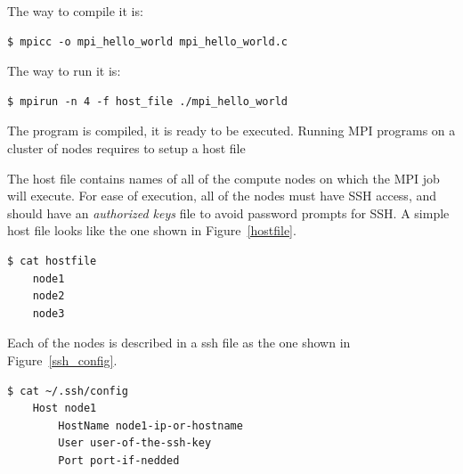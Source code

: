 \newpage

The way to compile it is: 

\begin{minipage}{\textwidth}
\end{minipage}

\begin{minipage}{\textwidth}
\begin{lstlisting}[frame=single]
  $ mpicc -o mpi_hello_world mpi_hello_world.c
\end{lstlisting}
\end{minipage}

The way to run it is: 

\begin{minipage}{\textwidth}
\end{minipage}

\begin{minipage}{\textwidth}
\begin{lstlisting}[frame=single]
  $ mpirun -n 4 -f host_file ./mpi_hello_world
\end{lstlisting}
\end{minipage}

The program is compiled, it is ready to be executed. Running MPI programs on a
cluster of nodes requires to setup a host file

The host file contains names of all of the compute nodes on which the  MPI job will
execute. For ease of execution, all of the nodes must have SSH access, and should 
have an \textit{authorized keys} file to avoid password prompts for SSH. A
simple host file looks like the one shown in Figure~\ref{hostfile}.

\begin{minipage}{\textwidth}
\end{minipage}

\begin{minipage}{\textwidth}
\begin{lstlisting}[frame=single]
  $ cat hostfile
    node1
    node2
    node3
\end{lstlisting}
\label{hostfile}
\end{minipage}

Each of the nodes is described in a ssh file as the one shown in
Figure~\ref{ssh_config}.

\begin{minipage}{\textwidth}
\end{minipage}

\begin{minipage}{\textwidth}

\begin{lstlisting}[frame=single]
  $ cat ~/.ssh/config
    Host node1
        HostName node1-ip-or-hostname
        User user-of-the-ssh-key
        Port port-if-nedded
\end{lstlisting}
\label{ssh_config}
\end{minipage}

